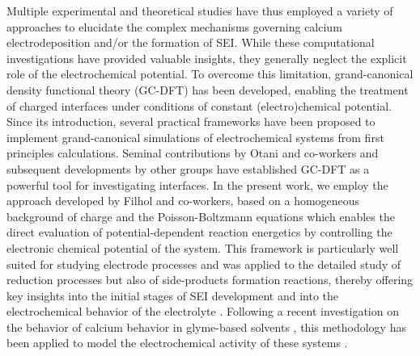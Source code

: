 \documentclass[twoside,twocolumn,9pt]{article}
\begin{document}
Multiple experimental \cite{aurbachElectrochemicalBehaviorCalcium1991,taUnderstandingCaElectrodeposition2019,forero-saboyaUnderstandingNaturePassivation2020,mcclaryHeterogeneousOxideEnables2022,zhaoRevealingSolidElectrolyte2022,melemedImpactDifferentialCa22023,bodinBoronBasedFunctionalAdditives2023} and theoretical \cite{hahnCriticalRoleConfigurational2020,liepinyaComputationalComparisonEther2021,yamijalaStabilityCalciumIon2021} studies have thus employed a variety of approaches to elucidate the complex mechanisms governing calcium electrodeposition and/or the formation of SEI. 
While these computational investigations have provided valuable insights, they generally neglect the explicit role of the electrochemical potential. 
To overcome this limitation, grand-canonical density functional theory (GC-DFT) has been developed, enabling the treatment of charged interfaces under conditions of constant (electro)chemical potential.\cite{lozovoiInitioSimulationCharged2001,sundararamanGrandCanonicalElectronic2017,melanderGrandcanonicalApproachDensity2018,melanderGrandCanonicalEnsemble2021} 
Since its introduction, several practical frameworks have been proposed to implement grand-canonical simulations of electrochemical systems from first principles calculations. 
Seminal contributions by Otani and co-workers\cite{otaniFirstprinciplesCalculationsCharged2006,bonnetFirstPrinciplesMolecularDynamics2012} and subsequent developments by other groups\cite{letchworth-weaverJointDensityFunctional2012,goodpasterIdentificationPossiblePathways2016,teschPropertiesPt111Electrolyte2021} have established GC-DFT as a powerful tool for investigating interfaces.
In the present work, we employ the approach developed by Filhol and co-workers,  based on a homogeneous background of charge and the Poisson-Boltzmann equations\cite{filholElucidationElectrochemicalActivation2006,taylorFirstPrinciplesReaction2006,lespesUsingImplicitSolvent2015,hagopianAdvancementHomogeneousBackground2022} which enables the direct evaluation of potential-dependent reaction energetics by controlling the electronic chemical potential of the system.
This framework is particularly well suited for studying electrode processes and was applied to the detailed study of reduction processes but also of side-products formation reactions, thereby offering key insights into the initial stages of SEI development and into the electrochemical behavior of the electrolyte \cite{kopaclautarElectrolyteReactivityDouble2020,kopaclautarModelingInterfacialElectrochemistry2020,bhandariElectrochemistryFirstprinciplesGrand2021}. 
Following a recent investigation on the behavior of calcium behavior in glyme-based solvents \cite{baonguyenInvestigatingAbnormalConductivity2022}, this methodology has been applied to model the electrochemical activity of these systems \cite{nguyenSolvationReductionCoupling2023}.
\end{document}
